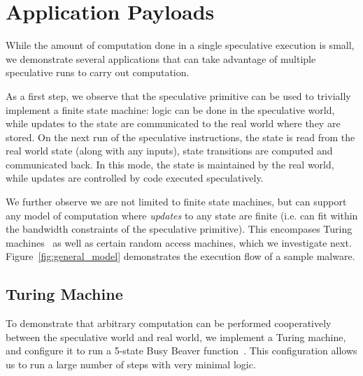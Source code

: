 
\section{Application Payloads}

While the amount of computation done in a single speculative execution is small,
we demonstrate several applications that can take advantage of multiple
speculative runs to carry out computation.

As a first step, we observe that the speculative primitive can be used to
trivially implement a finite state machine: logic can be done in the speculative
world, while updates to the state are communicated to the real world where they
are stored. On the next run of the speculative instructions, the state is read
from the real world state (along with any inputs), state transitions are
computed and communicated back. In this mode, the state is maintained by the
real world, while updates are controlled by code executed speculatively.

We further observe we are not limited to finite state machines, but can support
any model of computation where \emph{updates} to any state are finite (i.e. can
fit within the bandwidth constraints of the speculative primitive). This
encompases Turing machines~\cite{turing1937computable} as well as certain random
access machines, which we investigate next. Figure~\ref{fig:general_model}
demonstrates the execution flow of a sample \speculake malware.


\FigGeneralModel

\subsection{Turing Machine}
\label{subsec:turing}
To demonstrate that arbitrary computation can be performed cooperatively between
the speculative world and real world, we implement a Turing machine, and
configure it to run a 5-state Busy Beaver
function~\cite{turing1937computable,chaitin1987computing,herken1992universal}.
This configuration allows us to run a large number of steps with very minimal
logic.

